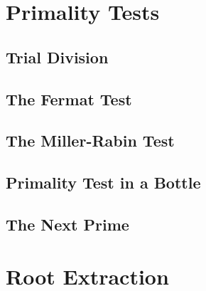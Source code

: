 \documentclass[b5paper]{book}
\begin{document}
\section{Primality Tests}
\subsection{Trial Division}
\subsection{The Fermat Test}
\subsection{The Miller-Rabin Test}
\subsection{Primality Test in a Bottle}
\subsection{The Next Prime}
\section{Root Extraction}
\end{document}
